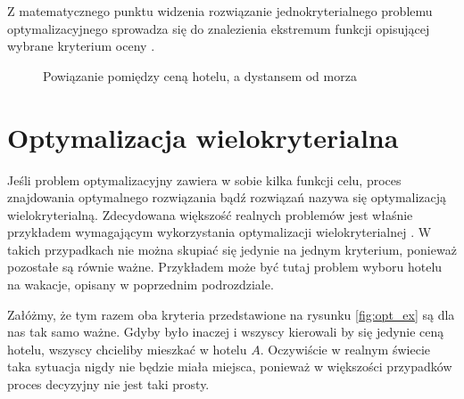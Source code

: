\documentclass[twoside]{iisthesis}
\begin{document}
Z matematycznego punktu widzenia rozwiązanie jednokryterialnego problemu optymalizacyjnego sprowadza się do znalezienia ekstremum  funkcji opisującej wybrane kryterium oceny \cite{wiki_pl_optimization}.
\begin{figure}[!htb]
	\centering
	\caption{Powiązanie pomiędzy ceną hotelu, a dystansem od morza}
	\label{fig:opt_ex}
\end{figure}
\section{Optymalizacja wielokryterialna}
Jeśli problem optymalizacyjny zawiera w sobie kilka funkcji celu, proces znajdowania optymalnego rozwiązania bądź rozwiązań nazywa się optymalizacją wielokryterialną. Zdecydowana większość realnych problemów jest właśnie przykładem wymagającym wykorzystania optymalizacji wielokryterialnej \cite{book}. W takich przypadkach nie można skupiać się jedynie na jednym kryterium, ponieważ pozostałe są równie ważne. Przykładem może być tutaj problem wyboru hotelu na wakacje, opisany w poprzednim podrozdziale. 

Załóżmy, że tym razem oba kryteria przedstawione na rysunku \eqref{fig:opt_ex} są dla nas tak samo ważne. Gdyby było inaczej i wszyscy kierowali by się jedynie ceną hotelu, wszyscy chcieliby mieszkać w hotelu $A$. Oczywiście w realnym świecie taka sytuacja nigdy nie będzie miała miejsca, ponieważ w większości przypadków proces decyzyjny nie jest taki prosty.
\end{document}

